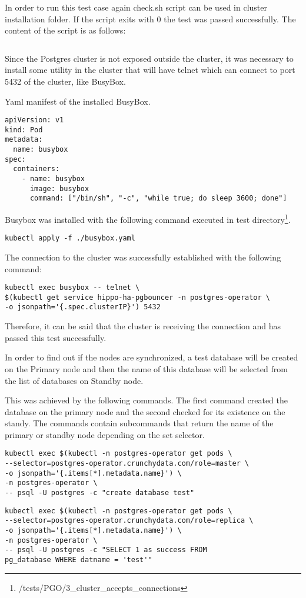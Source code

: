 In order to run this test case again check.sh script can be used in cluster installation folder. If the script exits with 0 the test was passed successfully. The content of the script is as follows:
\begin{verbatim}

\end{verbatim}

Since the Postgres cluster is not exposed outside the cluster, it was necessary to install some utility in the cluster that will have telnet which can connect to port 5432 of the cluster, like BusyBox.

Yaml manifest of the installed BusyBox.
\begin{verbatim}
apiVersion: v1
kind: Pod
metadata:
  name: busybox
spec:
  containers:
    - name: busybox
      image: busybox
      command: ["/bin/sh", "-c", "while true; do sleep 3600; done"]
\end{verbatim}

Busybox was installed with the following command executed in test directory\footnote{/tests/PGO/3\_cluster\_accepts\_connections}.
\begin{verbatim}
kubectl apply -f ./busybox.yaml
\end{verbatim}

The connection to the cluster was successfully established with the following command:

\begin{verbatim}
kubectl exec busybox -- telnet \
$(kubectl get service hippo-ha-pgbouncer -n postgres-operator \
-o jsonpath='{.spec.clusterIP}') 5432
\end{verbatim}

Therefore, it can be said that the cluster is receiving the connection and has passed this test successfully.

\n{3}{Cluster synchronization}
\label{chap:pgosync}
In order to find out if the nodes are synchronized, a test database will be created on the Primary node and then the name of this database will be selected from the list of databases on Standby node.

This was achieved by the following commands. The first command created the database on the primary node and the second checked for its existence on the standy. The commands contain subcommands that return the name of the primary or standby node depending on the set selector.

\begin{verbatim}
kubectl exec $(kubectl -n postgres-operator get pods \
--selector=postgres-operator.crunchydata.com/role=master \
-o jsonpath='{.items[*].metadata.name}') \
-n postgres-operator \
-- psql -U postgres -c "create database test"
\end{verbatim}
\begin{verbatim}
kubectl exec $(kubectl -n postgres-operator get pods \
--selector=postgres-operator.crunchydata.com/role=replica \
-o jsonpath='{.items[*].metadata.name}') \
-n postgres-operator \
-- psql -U postgres -c "SELECT 1 as success FROM 
pg_database WHERE datname = 'test'"
\end{verbatim}


